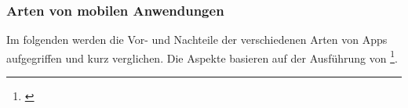 
\subsubsection{Arten von mobilen Anwendungen}
\label{sec:mobile_app_types}

Im folgenden werden die Vor- und Nachteile der verschiedenen Arten von Apps aufgegriffen und kurz verglichen. Die Aspekte basieren auf der Ausführung von \cite{Kollmann2020}\footnote{\cite[Vgl.][84--87]{Kollmann2020}}.

